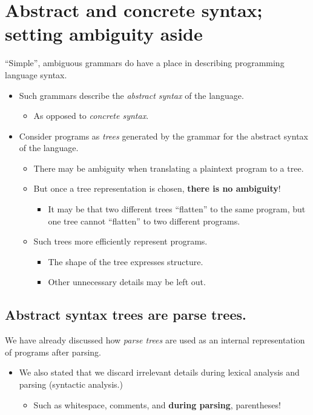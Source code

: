 \documentclass[11pt]{article}
\theoremstyle{definition}
\begin{document}
\section{Abstract and concrete syntax; setting ambiguity aside}
\label{sec:org60da28f}
“Simple”, ambiguous grammars do have a place in describing
programming language syntax.
\begin{itemize}
\item Such grammars describe the \emph{abstract syntax} of the language.
\begin{itemize}
\item As opposed to \emph{concrete syntax}.
\end{itemize}
\item Consider programs as \emph{trees} generated by the grammar
for the abstract syntax of the language.
\begin{itemize}
\item There may be ambiguity when translating a plaintext program to a tree.
\item But once a tree representation is chosen,
\textbf{there is no ambiguity}!
\begin{itemize}
\item It may be that two different trees “flatten” to the same program,
but one tree cannot “flatten” to two different programs.
\end{itemize}
\item Such trees more efficiently represent programs.
\begin{itemize}
\item The shape of the tree expresses structure.
\item Other unnecessary details may be left out.
\end{itemize}
\end{itemize}
\end{itemize}

\subsection{Abstract syntax trees are parse trees.}
\label{sec:orgfb24a65}
We have already discussed how \emph{parse trees} are used
as an internal representation of programs
after parsing.
\begin{itemize}
\item We also stated that we discard irrelevant details during
lexical analysis and parsing (syntactic analysis.)
\begin{itemize}
\item Such as whitespace, comments, and \textbf{during parsing}, parentheses!
\end{itemize}
\end{itemize}
\end{document}
